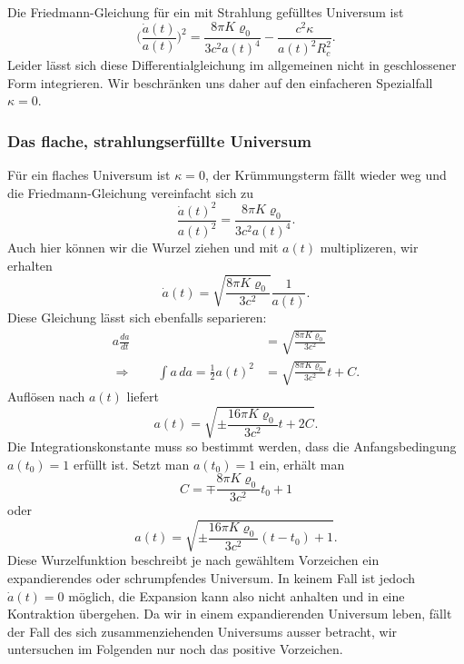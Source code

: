 Die Friedmann-Gleichung für ein mit Strahlung gefülltes Universum ist
\begin{equation}
\biggl(
\frac{\dot a(t)}{a(t)}
\biggr)^2
=
\frac{8\pi K \varrho_0}{3c^2a(t)^4}
-
\frac{c^2\kappa }{a(t)^2R_c^2}.
\end{equation}
Leider lässt sich diese Differentialgleichung im allgemeinen
nicht in geschlossener Form integrieren.
Wir beschränken uns daher auf den einfacheren Spezialfall $\kappa=0$.

\subsubsection{Das flache, strahlungserfüllte Universum}
Für ein flaches Universum ist $\kappa=0$, der Krümmungsterm fällt wieder
weg und die Friedmann-Gleichung vereinfacht sich zu
\begin{equation*}
\frac{\dot a(t)^2}{a(t)^2}
=
\frac{8\pi K\varrho_0}{3c^2 a(t)^4}.
\end{equation*}
Auch hier können wir die Wurzel ziehen und mit $a(t)$ multiplizeren,
wir erhalten
\begin{equation*}
\dot a(t)
=
\sqrt{\frac{8\pi K\varrho_0}{3c^2}}\frac1{a(t)}.
\end{equation*}
Diese Gleichung lässt sich ebenfalls separieren:
\begin{align*}
a\frac{da}{dt}
&=
\sqrt{\frac{8\pi K\varrho_0}{3c^2}}
\\
\Rightarrow\qquad
\int a\,da
=
\frac12a(t)^2
&=
\sqrt{\frac{8\pi K\varrho_0}{3c^2}}t + C.
\end{align*}
Auflösen nach $a(t)$ liefert
\[
a(t)
=
\sqrt{\pm\frac{16\pi K\varrho_0}{3c^2}t + 2C}.
\]
Die Integrationskonstante muss so bestimmt werden, dass die
Anfangsbedingung $a(t_0)=1$  erfüllt ist.
Setzt man $a(t_0)=1$ ein, erhält man
\[
C
=
\mp\frac{8\pi K\varrho_0}{3c^2}t_0+1
\]
oder
\begin{equation}
a(t)
= 
\sqrt{\pm\frac{16\pi K\varrho_0}{3c^2}(t-t_0) + 1}.
\label{skript:friedmann:a(t)}
\end{equation}
Diese Wurzelfunktion beschreibt je nach gewähltem Vorzeichen ein
expandierendes oder schrumpfendes Universum.
In keinem Fall ist jedoch $\dot a(t)=0$ möglich, die Expansion kann
also nicht anhalten und in eine Kontraktion übergehen.
Da wir in einem expandierenden Universum leben, fällt der Fall
des sich zusammenziehenden Universums ausser betracht,
wir untersuchen im Folgenden nur noch das positive Vorzeichen.

